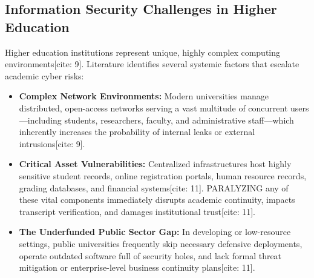 \documentclass[journal,onecolumn,12pt,twoside]{IEEEtran}
\begin{document}
	\subsection{Information Security Challenges in Higher Education}
	\label{subsec:university_security_challenges}
	Higher education institutions represent unique, highly complex computing environments[cite: 9]. Literature identifies several systemic factors that escalate academic cyber risks:
	\begin{itemize}
		\item \textbf{Complex Network Environments:} Modern universities manage distributed, open-access networks serving a vast multitude of concurrent users—including students, researchers, faculty, and administrative staff—which inherently increases the probability of internal leaks or external intrusions[cite: 9].
		\item \textbf{Critical Asset Vulnerabilities:} Centralized infrastructures host highly sensitive student records, online registration portals, human resource records, grading databases, and financial systems[cite: 11]. PARALYZING any of these vital components immediately disrupts academic continuity, impacts transcript verification, and damages institutional trust[cite: 11].
		\item \textbf{The Underfunded Public Sector Gap:} In developing or low-resource settings, public universities frequently skip necessary defensive deployments, operate outdated software full of security holes, and lack formal threat mitigation or enterprise-level business continuity plans[cite: 11].
	\end{itemize}
	
\end{document}

